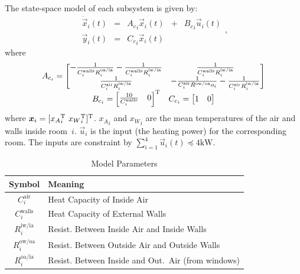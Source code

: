 \documentclass[../main.tex]{subfiles}
\begin{document}
The state-space model of each subsystem is given by:
\begin{equation}
  \begin{matrix}
    \label{eq:systems_cont}
    \dot{\vec{x}}_{i}(t)  &=&{A_{c}}_{i}\vec{x}_{i}(t) &+& {B_{c}}_{i}\vec{u}_{i}(t)\\
    \vec{y}_{i}(t)        &=&{C_{c}}_{i}\vec{x}_{i}(t) &&
  \end{matrix},
\end{equation}
where
\begin{equation}
  \label{eq:4}
  \begin{matrix}
    A_{\mathrm{c}_{i}}=\left[
      \begin{matrix}
        -\frac{1}{C^{\text{walls}}_{i}R^{\text{oa/ia}}_{i}}-\frac{1}{C^{\text{walls}}_{i}R^{\text{iw/ia}}_{i}}& \frac{1}{C^{\text{walls}}_{i}R^{\text{iw/ia}}_{i}}\\
        \frac{1}{C^{\text{air}}_{i}R^{\text{iw/ia}}_{i}} &-\frac{1}{C^{\text{air}}_{i}R^{\text{ow/oa}}o_{i}}-\frac{1}{C^{\text{air}}_{i}R^{\text{iw/ia}}_{i}}
      \end{matrix}\right]\\
    \begin{matrix}
      B_{\mathrm{c}_{i}}=\left[
        \begin{matrix}  \frac{10}{C^{\text{walls}}_{i}}& 0\end{matrix}
      \right]^{\mathrm{T}}&C_{\mathrm{c}_{i}}=\left[\begin{matrix}1 & 0\end{matrix}\right]
    \end{matrix}
  \end{matrix}
\end{equation}
where ${\vec{x}_{i}=[{{x}_{A}}_{i}\T\ {{x}_{W}}_{i}\T]\T}$. ${x_A}_i$ and ${x_W}_i$ are the mean temperatures of the air and walls inside room~$i$. $\vec{u}_{i}$ is the input (the heating power)
for the corresponding room. The inputs are constraint by ${\sum_{i=1}^{4}\vec{u}_{i}(t)\preceq 4\mathrm{kW}}$.

\begin{table}[b]
  \centering
  \caption{Model Parameters}\label{tab:modelParamMeaning}
  \begin{tabular}[b]{cl}
    \toprule
    Symbol&Meaning\\
    \midrule
    $C^{\text{air}}_{i}$  &Heat Capacity of Inside Air\\
    $C^{\text{walls}}_{i}$ &Heat Capacity of External Walls\\
    $R^{\text{iw/ia}}_{i}$ &Resist. Between Inside Air and Inside Walls\\
    $R^{\text{ow/oa}}_{i}$ &Resist. Between Outside Air and Outside Walls\\
    $R^{\text{oa/ia}}_{i}$ &Resist. Between Inside and Out.\ Air (from windows)\\
    \bottomrule
  \end{tabular}
\end{table}
\end{document}
